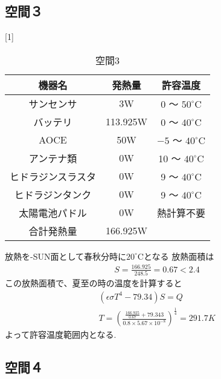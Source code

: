 \documentclass[15pt,uplatex,dvipdfmx]{jsarticle}
\begin{document}
\subsection{空間３}
\begin{table}[H]
  \begin{center}
  \caption{空間3}
  \scalebox{1}[1]{
  \begin{tabular}{|c|c|c|} \hline
    機器名 &  発熱量 & 許容温度 \\ \hline

  サンセンサ
  & 3W
  & 0 〜 ${50}^\circ\mathrm{C}$\\

  バッテリ
  & 113.925W
  & 0 〜 ${40}^\circ\mathrm{C}$\\

  AOCE
  & 50W
  & $-5$ 〜 ${40}^\circ\mathrm{C}$\\

  アンテナ類
  & 0W
  & 10 〜 ${40}^\circ\mathrm{C}$\\

  ヒドラジンスラスタ
  & 0W
  & 9 〜 ${40}^\circ\mathrm{C}$\\

  ヒドラジンタンク
  & 0W
  & 9 〜 ${40}^\circ\mathrm{C}$\\

  太陽電池パドル
  & 0W
  &  熱計算不要\\ \hline

  合計発熱量
  & 166.925W
  & \\\hline
  \end{tabular}
  }
\end{center}
\end{table}
放熱を-SUN面として春秋分時に${20}^\circ\mathrm{C}$となる
放熱面積は
\begin{eqnarray}
  S=\frac{166.925}{248.5}=0.67<2.4
\end{eqnarray}
この放熱面積で、夏至の時の温度を計算すると
\begin{eqnarray}
  (\epsilon\sigma T^4 -79.34)S=Q\\
  T =(\frac{\frac{166.925}{0.67}+79.343}
  {0.8\times5.67\times10^{-8}})^{\frac{1}{4}}=291.7K
\end{eqnarray}
よって許容温度範囲内となる.

\newpage
\subsection{空間４}
\end{document}
